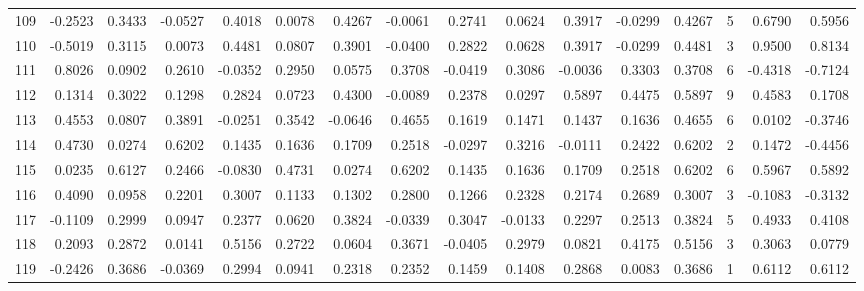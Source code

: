 \begin{tabular}{lrrrrrrrrrrrrrrr}
109 &     -0.2523 &  0.3433 & -0.0527 &  0.4018 &  0.0078 &  0.4267 & -0.0061 &  0.2741 &  0.0624 &  0.3917 &  -0.0299 &     0.4267 &      5 &                    0.6790 &                     0.5956 \\
110 &     -0.5019 &  0.3115 &  0.0073 &  0.4481 &  0.0807 &  0.3901 & -0.0400 &  0.2822 &  0.0628 &  0.3917 &  -0.0299 &     0.4481 &      3 &                    0.9500 &                     0.8134 \\
111 &      0.8026 &  0.0902 &  0.2610 & -0.0352 &  0.2950 &  0.0575 &  0.3708 & -0.0419 &  0.3086 & -0.0036 &   0.3303 &     0.3708 &      6 &                   -0.4318 &                    -0.7124 \\
112 &      0.1314 &  0.3022 &  0.1298 &  0.2824 &  0.0723 &  0.4300 & -0.0089 &  0.2378 &  0.0297 &  0.5897 &   0.4475 &     0.5897 &      9 &                    0.4583 &                     0.1708 \\
113 &      0.4553 &  0.0807 &  0.3891 & -0.0251 &  0.3542 & -0.0646 &  0.4655 &  0.1619 &  0.1471 &  0.1437 &   0.1636 &     0.4655 &      6 &                    0.0102 &                    -0.3746 \\
114 &      0.4730 &  0.0274 &  0.6202 &  0.1435 &  0.1636 &  0.1709 &  0.2518 & -0.0297 &  0.3216 & -0.0111 &   0.2422 &     0.6202 &      2 &                    0.1472 &                    -0.4456 \\
115 &      0.0235 &  0.6127 &  0.2466 & -0.0830 &  0.4731 &  0.0274 &  0.6202 &  0.1435 &  0.1636 &  0.1709 &   0.2518 &     0.6202 &      6 &                    0.5967 &                     0.5892 \\
116 &      0.4090 &  0.0958 &  0.2201 &  0.3007 &  0.1133 &  0.1302 &  0.2800 &  0.1266 &  0.2328 &  0.2174 &   0.2689 &     0.3007 &      3 &                   -0.1083 &                    -0.3132 \\
117 &     -0.1109 &  0.2999 &  0.0947 &  0.2377 &  0.0620 &  0.3824 & -0.0339 &  0.3047 & -0.0133 &  0.2297 &   0.2513 &     0.3824 &      5 &                    0.4933 &                     0.4108 \\
118 &      0.2093 &  0.2872 &  0.0141 &  0.5156 &  0.2722 &  0.0604 &  0.3671 & -0.0405 &  0.2979 &  0.0821 &   0.4175 &     0.5156 &      3 &                    0.3063 &                     0.0779 \\
119 &     -0.2426 &  0.3686 & -0.0369 &  0.2994 &  0.0941 &  0.2318 &  0.2352 &  0.1459 &  0.1408 &  0.2868 &   0.0083 &     0.3686 &      1 &                    0.6112 &                     0.6112 \\

\end{tabular}
